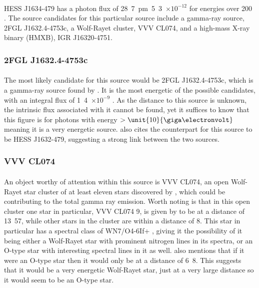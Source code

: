 \documentclass[a4paper, titlepage, oneside]{article}
\newcommand{\e}[1]{\ensuremath{\times 10^{#1}}}
\newcommand{\parsec}{\mathrm{pc}}
\newcommand{\photon}{\mathrm{ph}}
\begin{document}
\begin{multicols}{2}
\paragraph{}
HESS J1634-479 has a photon flux of \unit{28.7\pm5.3\e{-12}}{\photon\usk\centi\metre\rpsquared\usk\reciprocal\second} for energies over \unit{200}{\giga\electronvolt} \parencite{Aharonian:2006}. The source candidates for this particular source include a gamma-ray source, 2FGL J1632.4-4753c, a Wolf-Rayet cluster, VVV CL074, and a high-mass X-ray binary (HMXB), IGR J16320-4751.

\subsubsection{2FGL J1632.4-4753c}
\paragraph{}
The most likely candidate for this source would be 2FGL J1632.4-4753c, which is a gamma-ray source found by \textcite{Lande:2012}. It is the most energetic of the possible candidates, with an integral flux of \unit{1.4\e{-9}}{\photon\usk\centi\metre\rpsquared\usk\reciprocal\second} \parencite{Lande:2012}. As the distance to this source is unknown, the intrinsic flux associated with it cannot be found, yet it suffices to know that this figure is for photons with energy \(>\unit{10}{\giga\electronvolt}\) meaning it is a very energetic source. \textcite{Lande:2012} also cites the counterpart for this source to be HESS J1632-479, suggesting a strong link between the two sources.

\subsubsection{VVV CL074}
\paragraph{}
An object worthy of attention within this source is VVV CL074, an open Wolf-Rayet star cluster of at least eleven stars discovered by \textcite{Chene:2013}, which could be contributing to the total gamma ray emission. Worth noting is that in this open cluster one star in particular, VVV CL074 9, is given by \textcite{Chene:2013} to be at a distance of \unit{13.57}{\kilo\parsec}, while other stars in the cluster are within a distance of \unit{8}{\kilo\parsec}. This star in particular has a spectral class of WN7/O4-6If+ \parencite{Chene:2013}, giving it the possibility of it being either a Wolf-Rayet star with prominent nitrogen lines in its spectra, or an O-type star with interesting spectral lines in it as well. \textcite{Chene:2013} also mentions that if it were an O-type star then it would only be at a distance of \unit{6.8}{\kilo\parsec}. This suggests that it would be a very energetic Wolf-Rayet star, just at a very large distance so it would seem to be an O-type star.


\end{multicols}
\end{document}
